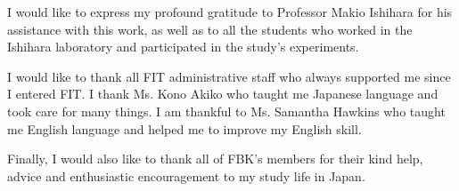 \documentclass[uplatex,
12pt, %
a4paper,
english, %
oneside,
titlepage,
singlespacing, %
liststotoc, %
headsepline,
]{MastersDoctoralThesis} %
\begin{document}
\begin{acknowledgements}
\addchaptertocentry{\acknowledgementname} %
%
I would like to express my profound gratitude to Professor Makio Ishihara for his assistance with this work, as well as to all the students who worked in the Ishihara laboratory and participated in the study's experiments.

\vspace{+0.5cm}
I would like to thank all FIT administrative staff who always supported me since I entered FIT. I thank Ms. Kono Akiko who taught me Japanese language and took care for many things. I am thankful to Ms. Samantha Hawkins who taught me English language and helped me to improve my English skill. 

\vspace{+0.5cm}
Finally, I would also like to thank all of FBK’s members for their kind help, advice and enthusiastic encouragement to my study life in Japan.
%

\end{acknowledgements}







%
%
%
\end{document}
